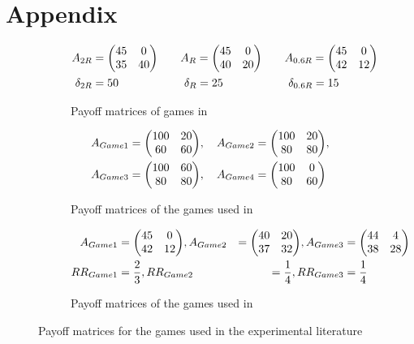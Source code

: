 \documentclass[11pt]{article}
\begin{document}
\section{Appendix}
\begin{figure}[H]
\begin{subfigure}{\textwidth}
\caption{Payoff matrices of games in \textcite{battalio_optimization_2001}}
        \label{fig:payoffbattalio}
        \centering
\begin{alignat*}{3}
        A_{2R} &= \mqty(45 & 0 \\ 35 & 40) \quad & &A_{R} = \mqty(45 & 0 \\ 
        40 & 20) \quad & &A_{0.6R} = \mqty( 45 & 0 \\ 42 & 12) \\
        \delta_{2R} &= 50  \quad & &\ \delta_{R} = 25 \quad & &\ \delta_{0.6R} = 15
\end{alignat*}
\end{subfigure}
\vspace*{50px}
\begin{subfigure}{\textwidth}
        \caption{Payoff matrices of the games used in \textcite{schmidt_playing_2003}}
        \centering
\label{fig:payoffschmidt}
\begin{alignat*}{3}
        A_{Game1} = \mqty( 100 & 20 \\ 60 & 60), \quad A_{Game2} 
                               &= \mqty( 100 & 20 \\ 80 & 80), \\ 
        A_{Game3} = \mqty( 100 
             & 60 \\ 80 & 80), \quad A_{Game4} &= \mqty( 100
                             & 0 \\ 80 & 60)
        \end{alignat*}
\end{subfigure}
\vspace{50px}
\begin{subfigure}{\textwidth}
        \caption{Payoff matrices of the games used
        in \textcite{dubois_optimization_2012}}
        \centering
        \label{fig:payoffdubois}
        \begin{alignat*}{3}     
                A_{Game1} &= \mqty(45 & 0 \\ 42 & 12),
                A_{Game2} &= \mqty(40 & 20 \\37 & 32),
                A_{Game3} &= \mqty(44 & 4 \\ 38 & 28) \\
                RR_{Game1}&= \frac 23, RR_{Game2}&=\frac 14, RR_{Game3}&=
                \frac 14
        \end{alignat*}
\end{subfigure}
\caption[Games in the laboratory experiments]{Payoff matrices for the 
games used in the experimental literature}
\end{figure}
\printbibliography
\end{document}
